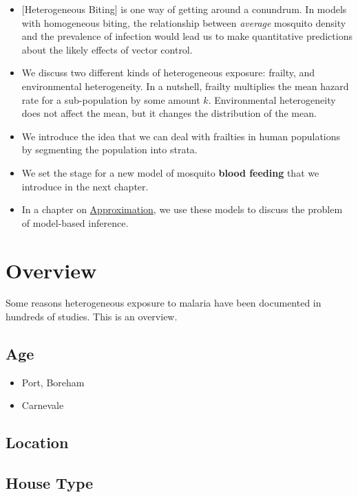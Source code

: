 \documentclass[
]{book}
\begin{document}
\begin{itemize}
\item
  {[}Heterogeneous Biting{]} is one way of getting around a conundrum. In models with homogeneous biting, the relationship between \emph{average} mosquito density and the prevalence of infection would lead us to make quantitative predictions about the likely effects of vector control.
\item
  We discuss two different kinds of heterogeneous exposure: frailty, and environmental heterogeneity. In a nutshell, frailty multiplies the mean hazard rate for a sub-population by some amount \(k\). Environmental heterogeneity does not affect the mean, but it changes the distribution of the mean.
\item
  We introduce the idea that we can deal with frailties in human populations by segmenting the population into strata.
\item
  We set the stage for a new model of mosquito \textbf{blood feeding} that we introduce in the next chapter.
\item
  In a chapter on \protect\hyperlink{approximation}{Approximation}, we use these models to discuss the problem of model-based inference.
\end{itemize}

\hypertarget{overview}{%
\section{Overview}\label{overview}}

Some reasons heterogeneous exposure to malaria have been documented in hundreds of studies. This is an overview.

\hypertarget{age}{%
\subsection{Age}\label{age}}

\begin{itemize}
\item
  Port, Boreham
\item
  Carnevale
\end{itemize}

\hypertarget{location}{%
\subsection{Location}\label{location}}

\hypertarget{house-type}{%
\subsection{House Type}\label{house-type}}
\end{document}
